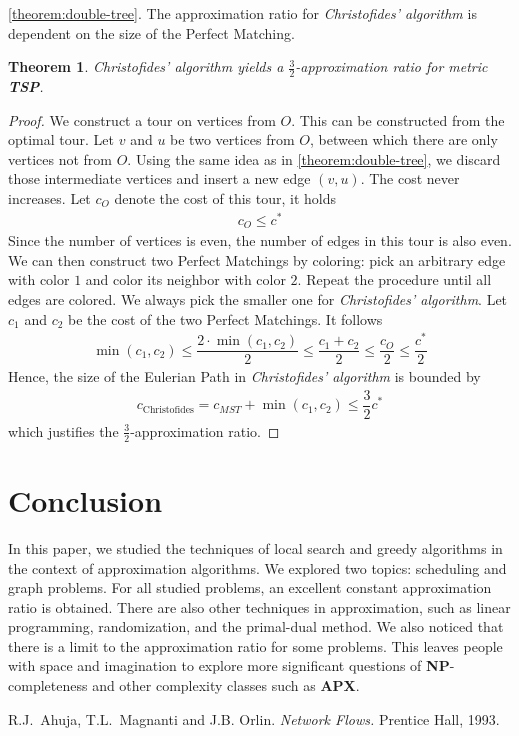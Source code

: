 \documentclass[11pt,psfig,times]{article}
\newcommand*{\NP}{\textbf{NP}}
\newtheorem{theorem}{Theorem}
\begin{document}
\cref{theorem:double-tree}. The approximation ratio for \textit{Christofides' algorithm} is dependent on the size 
of the Perfect Matching.
\begin{theorem}
    Christofides' algorithm yields a $\frac{3}{2}$-approximation ratio for metric \textbf{TSP}.
\end{theorem}
\begin{proof}
    We construct a tour on vertices from $O$. This can be constructed from the optimal tour. 
    Let $v$ and $u$ be two vertices from $O$, between which there are only vertices not from $O$. 
    Using the same idea as in \cref{theorem:double-tree}, we discard those intermediate vertices and 
    insert a new edge $(v, u)$. The cost never increases. Let $c_O$ denote the cost of this tour, 
    it holds 
    \begin{align*}
        c_O \leq c^*
    \end{align*}
    Since the number of vertices is even, the number of edges in this tour is also even. We can then 
    construct two Perfect Matchings by coloring: pick an arbitrary edge with color $1$ and 
    color its neighbor with color $2$. Repeat the procedure until all edges are colored. 
    We always pick the smaller one for \textit{Christofides' algorithm}.
    Let $c_1$ and $c_2$ be the cost of the two Perfect Matchings. It follows 
    \begin{align*}
        \min(c_1, c_2) \leq \dfrac{2 \cdot \min(c_1, c_2)}{2} \leq \dfrac{c_1 + c_2}{2} \leq \dfrac{c_O}{2} \leq \dfrac{c^*}{2}
    \end{align*}
    Hence, the size of the Eulerian Path in \textit{Christofides' algorithm} is bounded by 
    \begin{align*}
        c_{\text{Christofides}} = c_{MST} + \min(c_1, c_2) \leq \dfrac{3}{2} c^*
    \end{align*}
    which justifies the $\frac{3}{2}$-approximation ratio.
\end{proof}

\section{Conclusion}
In this paper, we studied the techniques of local search and greedy algorithms in 
the context of approximation algorithms. We explored two topics: scheduling and graph problems. 
For all studied problems, an excellent constant approximation ratio is obtained. There are also 
other techniques in approximation, such as linear programming, randomization, and the primal-dual method.
We also noticed that there is a limit to the approximation ratio for some problems. 
This leaves people with space and imagination to explore more significant questions of \NP-completeness and other complexity classes such as \textbf{APX}. 

\begin{thebibliography}{10}
\setlength{\itemsep}{0pt plus .3pt}
\setlength{\parsep}{0pt plus .3pt}
\setlength{\parskip}{0pt plus .3pt}

R.J.\ Ahuja, T.L.\ Magnanti and J.B. Orlin. {\em Network Flows.\/} Prentice Hall, 1993.

\end{thebibliography}
\end{document}
